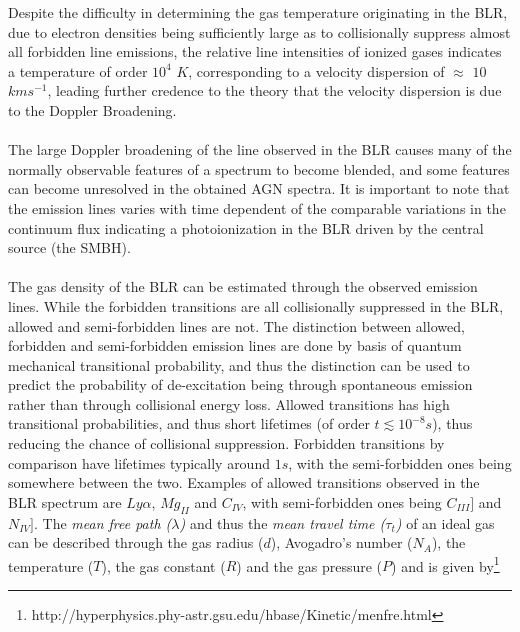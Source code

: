 \documentclass[a4paper, 12pt, twoside]{article}
\begin{document}
\noindent Despite the difficulty in determining the gas temperature originating in the BLR, due to electron densities being sufficiently large as to collisionally suppress almost all forbidden line emissions, the relative line intensities of ionized gases indicates a temperature of order $10^4$ $K$, corresponding to a velocity dispersion of $\approx$ $10$ $kms^{-1}$, leading further credence to the theory that the velocity dispersion is due to the Doppler Broadening. \\
\\%
The large Doppler broadening of the line observed in the BLR causes many of the normally observable features of a spectrum to become blended, and some features can become unresolved in the obtained AGN spectra. It is important to note that the emission lines varies with time dependent of the comparable variations in the continuum flux indicating a photoionization in the BLR driven by the central source (the SMBH). \\
\\
The gas density of the BLR can be estimated through the observed emission lines. While the forbidden transitions are all collisionally suppressed in the BLR, allowed and semi-forbidden lines are not. The distinction between allowed, forbidden and semi-forbidden emission lines are done by basis of quantum mechanical transitional probability, and thus the distinction can be used to predict the probability of de-excitation being through spontaneous emission rather than through collisional energy loss. Allowed transitions has high transitional probabilities, and thus short lifetimes (of order $t \lesssim 10^{-8}s$), thus reducing the chance of collisional suppression. Forbidden transitions by comparison have lifetimes typically around $1s$, with the semi-forbidden ones being somewhere between the two. Examples of allowed transitions observed in the BLR spectrum are $Ly\alpha$, $Mg_{II}$ and $C_{IV}$, with semi-forbidden ones being $C_{III}]$ and $N_{IV}]$. The \emph{mean free path ($\lambda$)} and thus the \emph{mean travel time ($\tau_{t}$)} of an ideal gas can be described through the gas radius ($d$), Avogadro's number ($N_{A}$), the temperature ($T$), the gas constant ($R$) and the gas pressure ($P$) and is given by\footnote{http://hyperphysics.phy-astr.gsu.edu/hbase/Kinetic/menfre.html}
\end{document}
